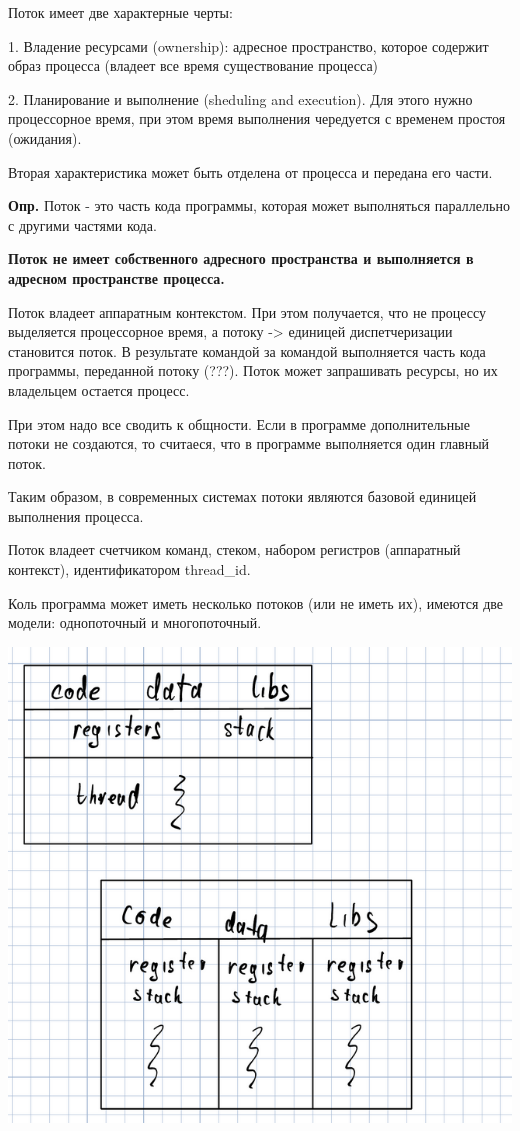 \documentclass[14pt, a4paper]{article}
\begin{document}
	Поток имеет две характерные черты:
	
	1. Владение ресурсами (ownership): адресное пространство, которое содержит образ процесса (владеет все время существование процесса)
	
	2. Планирование и выполнение (sheduling and execution). Для этого нужно процессорное время, при этом время выполнения чередуется с временем простоя (ожидания).
	
	Вторая характеристика может быть отделена от процесса и передана его части.
	
	{\bf Опр.} Поток - это часть кода программы, которая может выполняться параллельно с другими частями кода.
	
	{\bf Поток не имеет собственного адресного пространства и выполняется в адресном пространстве процесса.}
	
	Поток владеет аппаратным контекстом. При этом получается, что не процессу выделяется процессорное время, а потоку -> единицей диспетчеризации становится поток. В результате командой за командой выполняется часть кода программы, переданной потоку (???). Поток может запрашивать ресурсы, но их владельцем остается процесс.
	
	При этом надо все сводить к общности. Если в программе дополнительные потоки не создаются, то считаеся, что в программе выполняется один главный поток.
	
	Таким образом, в современных системах потоки являются базовой единицей выполнения процесса.
	
	Поток владеет счетчиком команд, стеком, набором регистров (аппаратный контекст), идентификатором thread\_id.
	
	Коль программа может иметь несколько потоков (или не иметь их), имеются две модели: однопоточный и многопоточный.
	
	\includegraphics[width=\linewidth]{5}
\end{document}
